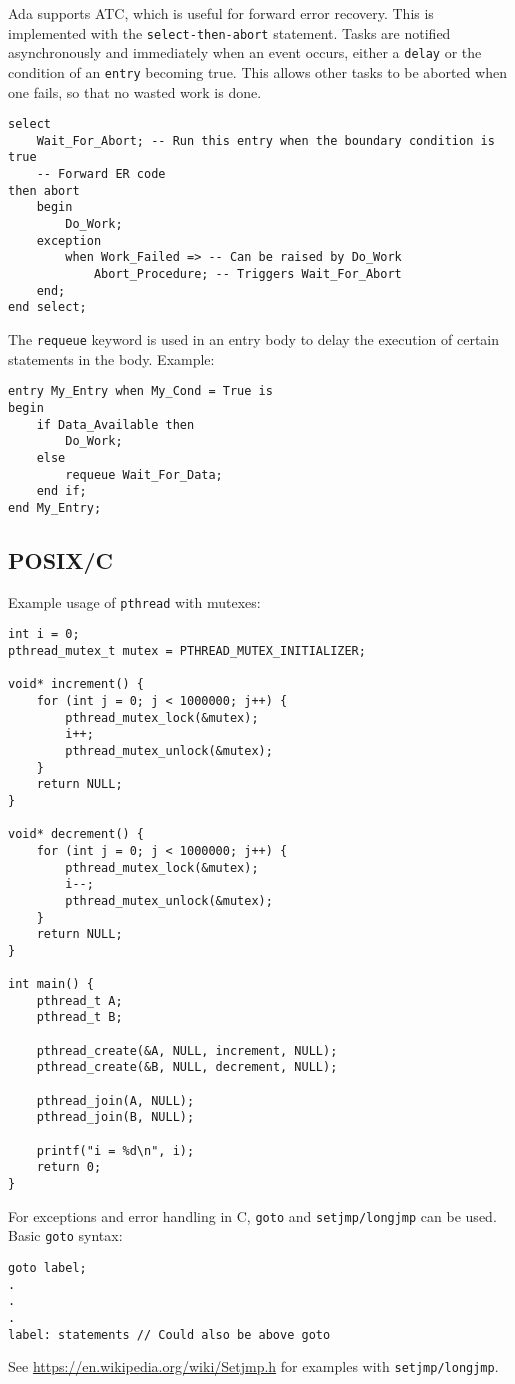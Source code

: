 Ada supports ATC, which is useful for forward error recovery. This is implemented with the \texttt{select-then-abort} statement. Tasks are notified asynchronously and immediately when an event occurs, either a \texttt{delay} or the condition of an \texttt{entry} becoming true. This allows other tasks to be aborted when one fails, so that no wasted work is done.
\begin{verbatim}
select
    Wait_For_Abort; -- Run this entry when the boundary condition is true
    -- Forward ER code
then abort
    begin
        Do_Work;
    exception
        when Work_Failed => -- Can be raised by Do_Work
            Abort_Procedure; -- Triggers Wait_For_Abort
    end;
end select;
\end{verbatim}
The \texttt{requeue} keyword is used in an entry body to delay the execution of certain statements in the body. Example:
\begin{verbatim}
entry My_Entry when My_Cond = True is 
begin
    if Data_Available then
        Do_Work;
    else
        requeue Wait_For_Data;
    end if;
end My_Entry;
\end{verbatim}

\subsection{POSIX/C}
Example usage of \texttt{pthread} with mutexes:
\begin{verbatim}
int i = 0;
pthread_mutex_t mutex = PTHREAD_MUTEX_INITIALIZER;

void* increment() {
    for (int j = 0; j < 1000000; j++) {
        pthread_mutex_lock(&mutex);
        i++;
        pthread_mutex_unlock(&mutex);
    }
    return NULL;
}

void* decrement() {
    for (int j = 0; j < 1000000; j++) {
        pthread_mutex_lock(&mutex);
        i--;
        pthread_mutex_unlock(&mutex);
    }
    return NULL;
}

int main() {
    pthread_t A;
    pthread_t B;

    pthread_create(&A, NULL, increment, NULL);
    pthread_create(&B, NULL, decrement, NULL);

    pthread_join(A, NULL);
    pthread_join(B, NULL);

    printf("i = %d\n", i);
    return 0;
}
\end{verbatim} 
\newpage
For exceptions and error handling in C, \texttt{goto} and \texttt{setjmp/longjmp} can be used. Basic \texttt{goto} syntax:
\begin{verbatim}
goto label;
.
.
.
label: statements // Could also be above goto
\end{verbatim}
See \url{https://en.wikipedia.org/wiki/Setjmp.h} for examples with \texttt{setjmp/longjmp}.